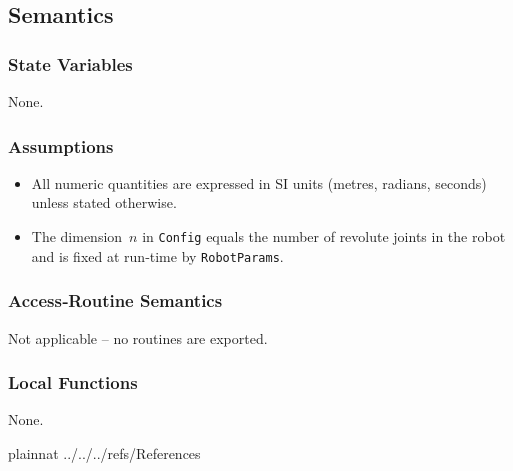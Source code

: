 \documentclass[12pt, titlepage]{article}
\begin{document}
\subsection{Semantics}
\subsubsection{State Variables}
None.

\subsubsection{Assumptions}
\begin{itemize}
  \item All numeric quantities are expressed in SI units
        (metres, radians, seconds) unless stated otherwise.
  \item The dimension~$n$ in \texttt{Config} equals the number
        of revolute joints in the robot and is fixed at run‑time
        by \texttt{RobotParams}.
\end{itemize}

\subsubsection{Access‑Routine Semantics}
Not applicable – no routines are exported.

\subsubsection{Local Functions}
None.


\newpage


 {plainnat}
 {../../../refs/References}







\end{document}
